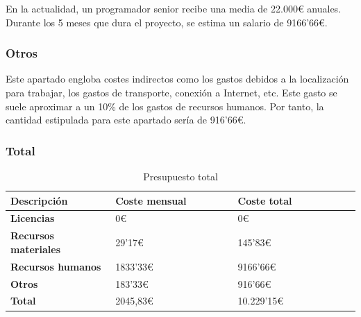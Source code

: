 \begin{adjustwidth}{2em}{0pt}
	En la actualidad, un programador senior recibe una media de 22.000€ anuales. Durante los 5 meses que dura el proyecto, se estima un salario de 9166'66€. 
	
	\subsubsection{Otros}
	
	Este apartado engloba costes indirectos como los gastos debidos a la localización para trabajar, los gastos de transporte, conexión a Internet, etc. Este gasto se suele aproximar a un 10\% de los gastos de recursos humanos. Por tanto, la cantidad estipulada para este apartado sería de 916'66€. 
	
	\newpage
	
	\subsubsection{Total}
	
\begin{table}[htb!]
	\centering %
	\begin{tabular}{|p{0.3\linewidth}|p{0.35\linewidth}|p{0.35\linewidth}|}
		\hline
		\rowcolor{grayshade} \textbf{Descripción} & \textbf{Coste mensual} & \textbf{Coste total} \\
		\hline
		\textbf{Licencias} & 0€ & 0€ \\
		\hline
		\textbf{Recursos materiales} & 29'17€ & 145'83€ \\
		\hline
		\textbf{Recursos humanos} & 1833'33€ & 9166'66€ \\
		\hline
		\textbf{Otros} & 183'33€ & 916'66€ \\
		\hline
		\textbf{Total} & 2045,83€ & 10.229'15€ \\
		\hline
	\end{tabular}
	\caption{Presupuesto total}
\end{table}
\end{adjustwidth} 
